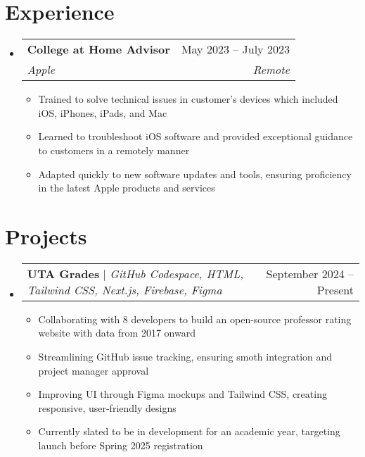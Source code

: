 \documentclass[letterpaper,11pt]{article}
\makeatletter
\newcommand{\resumeItem}[1]{
  \item\small{
    {#1 \vspace{-2pt}}
  }
}
\newcommand{\resumeSubheading}[4]{
  \vspace{-2pt}\item
    \begin{tabular*}{0.97\textwidth}[t]{l@{\extracolsep{\fill}}r}
      \textbf{#1} & #2 \\
      \textit{\small#3} & \textit{\small #4} \\
    \end{tabular*}\vspace{-7pt}
}
\newcommand{\resumeSubSubheading}[2]{
    \item
    \begin{tabular*}{0.97\textwidth}{l@{\extracolsep{\fill}}r}
      \textit{\small#1} & \textit{\small #2} \\
    \end{tabular*}\vspace{-7pt}
}
\newcommand{\resumeProjectHeading}[2]{
    \item
    \begin{tabular*}{0.97\textwidth}{l@{\extracolsep{\fill}}r}
      \small#1 & #2 \\
    \end{tabular*}\vspace{-7pt}
}
\newcommand{\resumeSubHeadingListStart}{\begin{itemize}[leftmargin=0.15in, label={}]}
\newcommand{\resumeSubHeadingListEnd}{\end{itemize}}
\newcommand{\resumeItemListStart}{\begin{itemize}}
\newcommand{\resumeItemListEnd}{\end{itemize}\vspace{-5pt}}
\makeatother
\begin{document}
\section{Experience}
  \resumeSubHeadingListStart

    \resumeSubheading
      {College at Home Advisor}{May 2023 -- July 2023}
      {Apple}{Remote}
      \resumeItemListStart
        \resumeItem{Trained to solve technical issues in customer's devices which included iOS, iPhones, iPads, and Mac}
        \resumeItem{Learned to troubleshoot iOS software and provided exceptional guidance to customers in a remotely manner}
        \resumeItem{Adapted quickly to new software updates and tools, ensuring proficiency in the latest Apple products and services}
        \resumeItemListEnd
    \resumeSubHeadingListEnd



\section{Projects}

\resumeSubHeadingListStart
\resumeProjectHeading
    {\textbf{UTA Grades} $|$ \emph{GitHub Codespace, HTML, Tailwind CSS, Next.js, Firebase, Figma}}{September 2024 -- Present}
    \resumeItemListStart
      \resumeItem{Collaborating with 8 developers to build an open-source professor rating website with data from 2017 onward}
      \resumeItem{Streamlining GitHub issue tracking, ensuring smoth integration and project manager approval}
      \resumeItem{Improving UI through Figma mockups and Tailwind CSS, creating responsive, user-friendly designs}
      \resumeItem{Currently slated to be in development for an academic year, targeting launch before
      Spring 2025 registration}
    \resumeItemListEnd
\resumeSubHeadingListEnd

\end{document}
